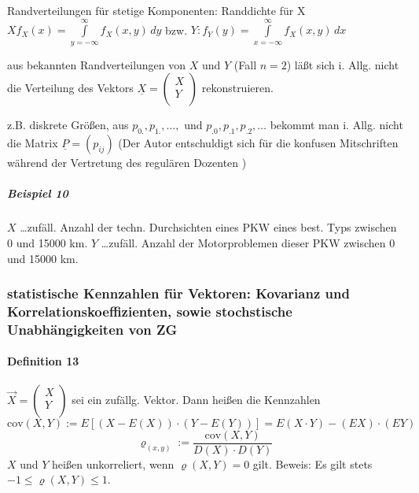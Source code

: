 \documentclass[a4paper]{scrartcl}
\begin{document}
Randverteilungen für stetige Komponenten: Randdichte für X 
$X  f_X(x) = \int\limits_{y= - \infty}^\infty f_X (x,y) \, dy$ bzw. $Y: f_Y (y) = \int\limits_{x=-\infty}^\infty f_X (x,y) \, dx$

aus bekannten Randverteilungen von $X$ und $Y$ (Fall $n=2$) läßt sich i. Allg. nicht die Verteilung des Vektors $\underline{X} = \begin{pmatrix} X \\ Y \\ \end{pmatrix}$ rekonstruieren.

z.B. diskrete Größen, aus $p_{0.}, p_{1.}, \dots,$ und $p_{.0},p_{.1}, p_{.2}, \dots$ bekommt man i. Allg. nicht die Matrix $\underline{P} = (p_{ij})$ (Der Autor entschuldigt sich für die konfusen Mitschriften während der Vertretung des regulären Dozenten )%

\subparagraph{Beispiel 10} $X$ \dots zufäll. Anzahl der techn. Durchsichten eines PKW eines best. Typs zwischen 0 und 15000 km.
$Y$ \dots zufäll. Anzahl der Motorproblemen dieser PKW zwischen 0 und 15000 km.


\subsubsection{statistische Kennzahlen für Vektoren: Kovarianz und Korrelationskoeffizienten, sowie stochstische Unabhängigkeiten von ZG}

\paragraph{Definition 13} $\vec{X} = \begin{pmatrix} X \\ Y \\\end{pmatrix}$ sei ein zufällg. Vektor. Dann heißen die Kennzahlen
\[ \text{cov} (X,Y) := E[(X-E(X)) \cdot (Y-E(Y)) ] = E(X\cdot Y) - (EX) \cdot (EY)\]
\[ \varrho_{(x,y)} := \frac{\text{cov} (X,Y)}{D(X) \cdot D(Y)}\]
$X$ und $Y$ heißen unkorreliert, wenn $\varrho (X,Y) = 0$ gilt. Beweis: Es gilt stets $-1 \leq \varrho(X,Y) \leq 1$.
\end{document}
